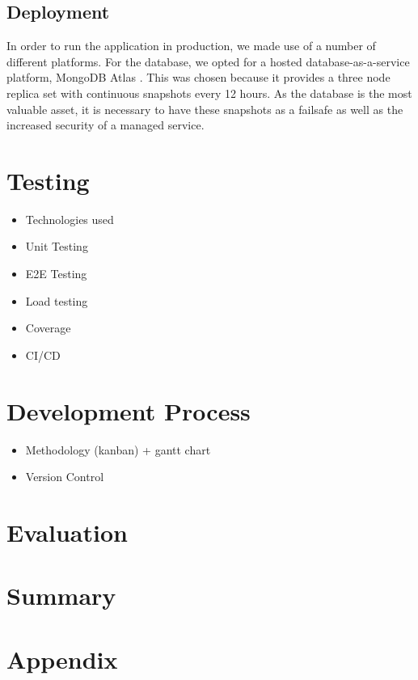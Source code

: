 \documentclass[12pt]{article}
\begin{document}
\subsection{Deployment}
In order to run the application in production, we made use of a number of different platforms. For the database, we opted for a hosted database-as-a-service platform, MongoDB Atlas \cite{mongodb_atlas}. This was chosen because it provides a three node replica set with continuous snapshots every 12 hours. As the database is the most valuable asset, it is necessary to have these snapshots as a failsafe as well as the increased security of a managed service.

\section{Testing}
\begin{itemize}
    \item Technologies used
    \item Unit Testing
    \item E2E Testing
    \item Load testing
    \item Coverage
    \item CI/CD
\end{itemize}

\section{Development Process}
\begin{itemize}
    \item Methodology (kanban) + gantt chart
    \item Version Control
\end{itemize}

\section{Evaluation}

\section{Summary}

\section{Appendix}
\end{document}
